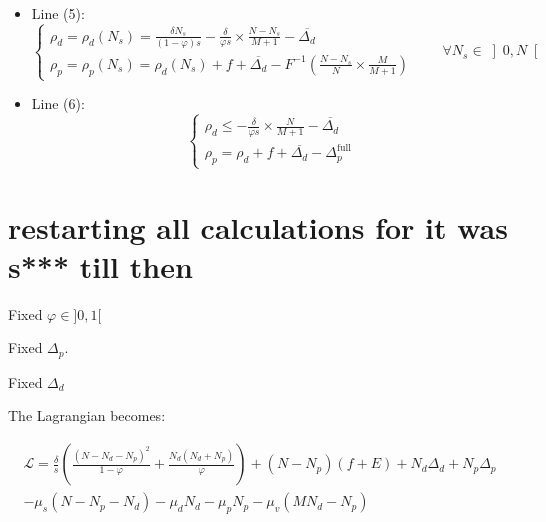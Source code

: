 \documentclass[english, a4paper]{article}
\theoremstyle{plain}
\theoremstyle{definition}
\theoremstyle{remark}
\begin{document}
\begin{itemize}
    \item Line (5):
    \begin{equation*}
        \left\{
        \begin{array}{l}
            \rho_d = \rho_d (N_s) = \frac{\delta N_s}{(1-\varphi)s} - \frac{\delta}{\varphi s} \times \frac{N - N_s}{M+1} - \overline{\Delta_d}\\
            \rho_p = \rho_p(N_s) = \rho_d(N_s) + f + \overline{\Delta_d} - F^{-1} \left( \frac{N - N_s}{N} \times \frac{M}{M+1} \right)
        \end{array}
        \right.
        \qquad \forall N_s \in \left]0, N\right[
    \end{equation*}

    \item Line (6):
    \begin{equation*}
        \left\{
        \begin{array}{l}
            \rho_d \leq - \frac{\delta}{\varphi s} \times \frac{N}{M+1} - \overline{\Delta_d}\\
            \rho_p = \rho_d + f + \overline{\Delta_d} - \Delta_p^{\text{full}}             
        \end{array}
        \right.
    \end{equation*}
    
\end{itemize}




\section{restarting all calculations for it was s*** till then}

Fixed $\varphi \in ]0, 1[$

Fixed $\Delta_p$.

Fixed $\Delta_d$


The Lagrangian becomes:

\begin{multline}
\label{eq_lagrangian_linear}
    \mathcal{L} = \frac{\delta}{s} \left( \frac{(N - N_d - N_p)^2}{1 - \varphi} + \frac{N_d (N_d + N_p)}{\varphi} \right) + (N - N_p)(f+E) + N_d \Delta_d + N_p \Delta_p\\
    -\mu_s(N - N_p - N_d) - \mu_d N_d - \mu_p N_p - \mu_v (M N_d - N_p)
\end{multline}
\end{document}
